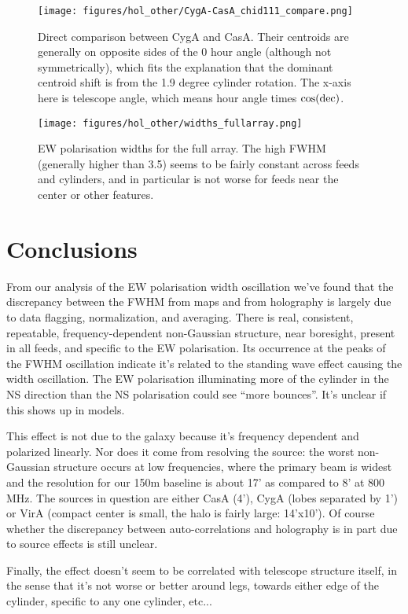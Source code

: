 \begin{figure}[h!]
\texttt{[image: figures/hol\_other/CygA-CasA\_chid111\_compare.png]}
\caption{Direct comparison between CygA and CasA. Their centroids are generally on opposite sides of the 0 hour angle (although not symmetrically), which fits the explanation that the dominant centroid shift is from the 1.9 degree cylinder rotation. The x-axis here is telescope angle, which means hour angle times $\cos(\rm{dec})$.}
\label{cygacasa}
\end{figure} 

\begin{figure}[h!]
\texttt{[image: figures/hol\_other/widths\_fullarray.png]}
\caption{EW polarisation widths for the full array. The high FWHM (generally higher than 3.5) seems to be fairly constant across feeds and cylinders, and in particular is not worse for feeds near the center or other features.}
\label{fullarray}
\end{figure} 

\section{Conclusions}
From our analysis of the EW polarisation width oscillation we've found that the discrepancy between the FWHM from maps and from holography is largely due to data flagging, normalization, and averaging. There is real, consistent, repeatable, frequency-dependent non-Gaussian structure, near boresight, present in all feeds, and specific to the EW polarisation. Its occurrence at the peaks of the FWHM oscillation indicate it's related to the standing wave effect causing the width oscillation. The EW polarisation illuminating more of the cylinder in the NS direction than the NS polarisation could see ``more bounces''. It's unclear if this shows up in models.

This effect is not due to the galaxy because it's frequency dependent and polarized linearly. Nor does it come from resolving the source: the worst non-Gaussian structure occurs at low frequencies, where the primary beam is widest and the resolution for our 150m baseline is about 17' as compared to 8' at 800 MHz. The sources in question are either CasA (4'), CygA (lobes separated by 1') or VirA (compact center is small, the halo is fairly large: 14'x10'). Of course whether the discrepancy between auto-correlations and holography is in part due to source effects is still unclear.

Finally, the effect doesn't seem to be correlated with telescope structure itself, in the sense that it's not worse or better around legs, towards either edge of the cylinder, specific to any one cylinder, etc...



